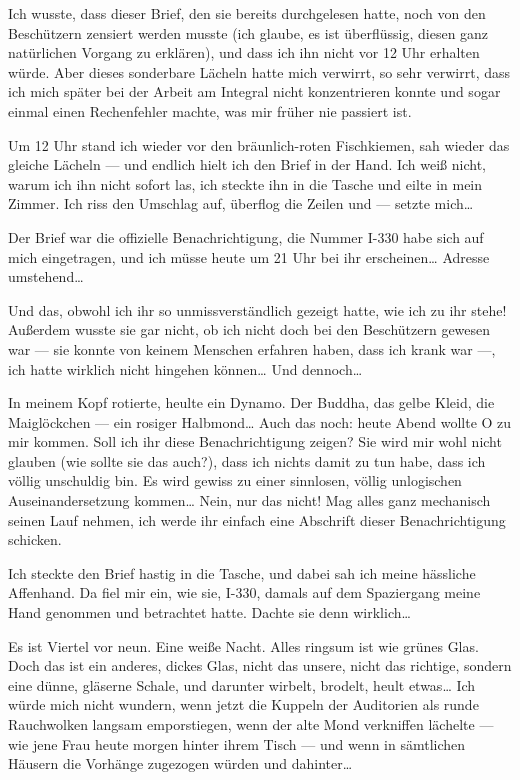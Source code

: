 Ich wusste, dass dieser Brief, den sie bereits durchgelesen hatte,
noch von den Beschützern zensiert werden musste (ich glaube, es ist
überflüssig, diesen ganz natürlichen Vorgang zu erklären), und dass
ich ihn nicht vor 12 Uhr erhalten würde. Aber dieses sonderbare
Lächeln hatte mich verwirrt, so sehr verwirrt, dass ich mich später
bei der Arbeit am Integral nicht konzentrieren konnte und sogar
einmal einen Rechenfehler machte, was mir früher nie passiert ist.

Um 12 Uhr stand ich wieder vor den bräunlich-roten Fischkiemen, sah
wieder das gleiche Lächeln — und endlich hielt ich den Brief in der
Hand. Ich weiß nicht, warum ich ihn nicht sofort las, ich steckte
ihn in die Tasche und eilte in mein Zimmer. Ich riss den Umschlag
auf, überflog die Zeilen und — setzte mich\ldots{}

Der Brief war die
offizielle Benachrichtigung, die Nummer I-330 habe sich auf mich
eingetragen, und ich müsse heute um 21 Uhr bei ihr erscheinen\ldots{}
Adresse umstehend\ldots{}

Und das, obwohl ich ihr so unmissverständlich gezeigt hatte, wie
ich zu ihr stehe! Außerdem wusste sie gar nicht, ob ich nicht doch
bei den Beschützern gewesen war — sie konnte von keinem Menschen
erfahren haben, dass ich krank war —, ich hatte wirklich nicht
hingehen können\ldots{} Und dennoch\ldots{}

In meinem Kopf rotierte, heulte ein Dynamo. Der Buddha, das gelbe
Kleid, die Maiglöckchen — ein rosiger Halbmond\ldots{} Auch das noch:
heute Abend wollte O zu mir kommen. Soll ich ihr diese
Benachrichtigung zeigen? Sie wird mir wohl nicht glauben (wie
sollte sie das auch?), dass ich nichts damit zu tun habe, dass ich
völlig unschuldig bin. Es wird gewiss zu einer sinnlosen, völlig
unlogischen Auseinandersetzung kommen\ldots{} Nein, nur
das nicht! Mag alles ganz mechanisch seinen Lauf nehmen, ich werde
ihr einfach eine Abschrift dieser Benachrichtigung schicken.

Ich steckte den Brief hastig in die Tasche, und dabei sah ich meine
hässliche Affenhand. Da fiel mir ein, wie sie, I-330, damals auf
dem Spaziergang meine Hand genommen und betrachtet hatte. Dachte
sie denn wirklich\ldots{} 

Es ist Viertel vor neun. Eine weiße Nacht.
Alles ringsum ist wie grünes Glas. Doch das ist ein anderes, dickes
Glas, nicht das unsere, nicht das richtige, sondern eine dünne,
gläserne Schale, und darunter wirbelt, brodelt, heult etwas\ldots{} Ich
würde mich nicht wundern, wenn jetzt die Kuppeln der Auditorien als
runde Rauchwolken langsam emporstiegen, wenn der alte Mond
verkniffen lächelte — wie jene Frau heute morgen hinter ihrem Tisch
— und wenn in sämtlichen Häusern die Vorhänge zugezogen würden und
dahinter\ldots{}

